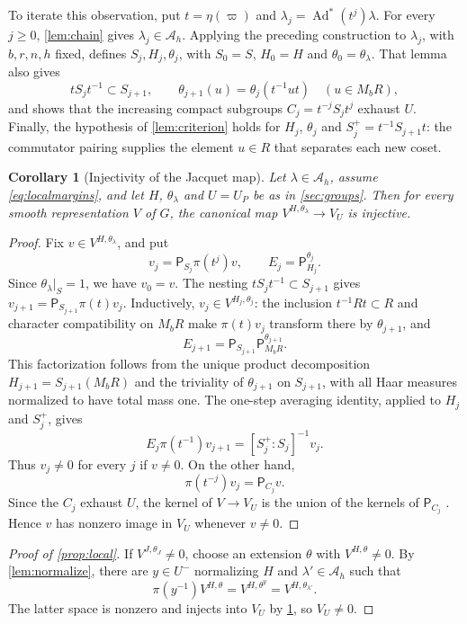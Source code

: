 \documentclass[11pt,reqno]{amsart}
\numberwithin{equation}{section}
\theoremstyle{plain}
\newtheorem{corollary}[theorem]{Corollary}
\theoremstyle{definition}
\theoremstyle{remark}
\theoremstyle{plain}
\DeclareMathOperator{\Ad}{Ad}
\newcommand{\lf}{\lambda}
\newcommand{\Avg}{\mathsf{P}}
\begin{document}
To iterate this observation, put $t=\eta(\varpi)$ and
$\lf_j=\Ad^*(t^j)\lf$. For every $j\ge0$, \cref{lem:chain} gives
$\lf_j\in\mathcal A_h$.
Applying the preceding construction to $\lf_j$, with $b,r,n,h$ fixed,
defines $S_j,H_j,\theta_j$, with $S_0=S$, $H_0=H$ and
$\theta_0=\theta_\lf$.
That lemma also gives
\[
tS_jt^{-1}\subset S_{j+1},\qquad
\theta_{j+1}(u)=\theta_j(t^{-1}ut)\quad(u\in M_bR),
\]
and shows that the increasing compact subgroups
$C_j=t^{-j}S_jt^j$ exhaust $U$. Finally, the hypothesis of
\cref{lem:criterion} holds for $H_j$, $\theta_j$ and
$S_j^+=t^{-1}S_{j+1}t$: the commutator pairing supplies the element
$u\in R$ that separates each new coset.

\begin{corollary}[Injectivity of the Jacquet map]\label{cor:jacquet}
Let $\lf\in\mathcal A_h$, assume \eqref{eq:localmargins}, and let $H$,
$\theta_\lf$ and $U=U_P$ be as in \cref{sec:groups}. Then
for every smooth representation $V$ of $G$, the canonical map
$V^{H,\theta_\lf}\longrightarrow V_U$ is injective.
\end{corollary}

\begin{proof}
Fix $v\in V^{H,\theta_\lf}$, and put
\[
v_j=\Avg_{S_j}\pi(t^j)v,\qquad E_j=\Avg_{H_j}^{\theta_j}.
\]
Since $\theta_\lf|_S=1$, we have $v_0=v$. The nesting
$tS_jt^{-1}\subset S_{j+1}$ gives
$v_{j+1}=\Avg_{S_{j+1}}\pi(t)v_j$.
Inductively, $v_j\in V^{H_j,\theta_j}$: the inclusion
$t^{-1}Rt\subset R$ and character compatibility on $M_bR$ make
$\pi(t)v_j$ transform there by $\theta_{j+1}$, and
\[
E_{j+1}=\Avg_{S_{j+1}}\Avg_{M_bR}^{\theta_{j+1}}.
\]
This factorization follows from the unique product decomposition
$H_{j+1}=S_{j+1}(M_bR)$ and the triviality of $\theta_{j+1}$ on
$S_{j+1}$, with all Haar measures normalized to have total mass one.
The one-step averaging identity, applied to $H_j$ and $S_j^+$, gives
\[
E_j\pi(t^{-1})v_{j+1}=[S_j^+:S_j]^{-1}v_j.
\]
Thus $v_j\ne0$ for every $j$ if $v\ne0$. On the other hand,
\begin{equation}\label{eq:telescope}
\pi(t^{-j})v_j=\Avg_{C_j}v.
\end{equation}
Since the $C_j$ exhaust $U$, the kernel of $V\to V_U$ is the union of
the kernels of $\Avg_{C_j}$ \cite[\S3.2]{CassNotes}. Hence $v$ has
nonzero image in $V_U$ whenever $v\ne0$.
\end{proof}

\begin{proof}[Proof of \cref{prop:local}]
If $V^{J,\theta_J}\ne0$, choose an extension $\theta$ with
$V^{H,\theta}\ne0$. By \cref{lem:normalize}, there are $y\in U^-$
normalizing $H$ and $\lf'\in\mathcal A_h$ such that
\[
\pi(y^{-1})V^{H,\theta}=V^{H,\theta^y}
=V^{H,\theta_{\lf'}}.
\]
The latter space is nonzero and injects into $V_U$ by
\cref{cor:jacquet}, so $V_U\ne0$.
\end{proof}
\end{document}
